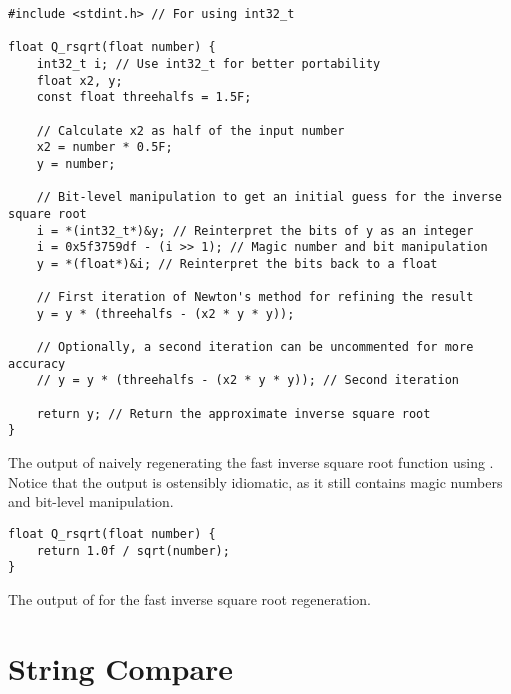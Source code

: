 \begin{listing}[h]
\begin{verbatim}
#include <stdint.h> // For using int32_t

float Q_rsqrt(float number) {
    int32_t i; // Use int32_t for better portability
    float x2, y;
    const float threehalfs = 1.5F;

    // Calculate x2 as half of the input number
    x2 = number * 0.5F;
    y = number;

    // Bit-level manipulation to get an initial guess for the inverse square root
    i = *(int32_t*)&y; // Reinterpret the bits of y as an integer
    i = 0x5f3759df - (i >> 1); // Magic number and bit manipulation
    y = *(float*)&i; // Reinterpret the bits back to a float

    // First iteration of Newton's method for refining the result
    y = y * (threehalfs - (x2 * y * y));

    // Optionally, a second iteration can be uncommented for more accuracy
    // y = y * (threehalfs - (x2 * y * y)); // Second iteration

    return y; // Return the approximate inverse square root
}
\end{verbatim}
  \caption{The output of naively regenerating the fast inverse square root function using \gptmodel.
  Notice that the output is ostensibly idiomatic, as it still contains 
  magic numbers and bit-level manipulation.}
  \label{lst:fast_inv_sqrt_gpt}
\end{listing}

\begin{listing}
\begin{verbatim}
float Q_rsqrt(float number) {
    return 1.0f / sqrt(number);
}
\end{verbatim}
\caption{The output of \sys for the fast inverse square root regeneration.}
  \label{lst:fast_inv_sqrt_sys}
\end{listing}


\section{String Compare}

